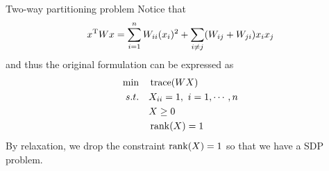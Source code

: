 \begin{example}{Two-way partitioning problem}
Notice that
\begin{equation*}
x^{{\rm T}}Wx = \sum^n_{i=1}W_{ii}(x_i)^2+\sum_{i\neq j}(W_{ij}+W_{ji})x_ix_j
\end{equation*}
and thus the original formulation can be expressed as
\begin{align*}
\min \quad&\operatorname{trace}(WX) \\
s.t. \quad&X_{ii} = 1,\ i = 1,\cdots,n\\
&X\geq 0\\
&\operatorname{rank}(X) = 1
\end{align*}
By relaxation, we drop the constraint $\operatorname{rank}(X) = 1$ so that we have a SDP problem.


\end{example}
